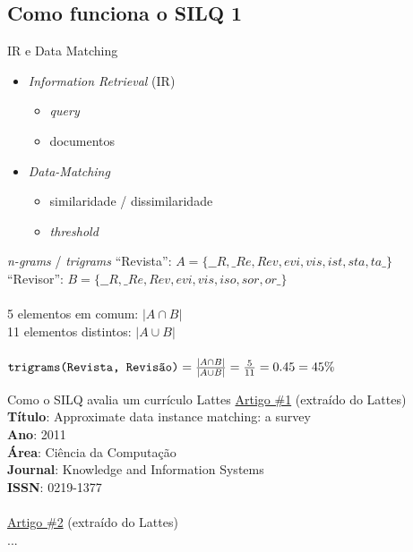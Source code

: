 \documentclass{beamer}
\newcommand{\quotes}[1]{``#1''}
\begin{document}
\subsection{Como funciona o SILQ 1}

\begin{frame}{IR e Data Matching}
  \begin{itemize}
    \item \textit{Information Retrieval} (IR)
    \begin{itemize}
      \item \textit{query}
      \item documentos
    \end{itemize}

    \item \textit{Data-Matching}
    \begin{itemize}
      \item similaridade / dissimilaridade
      \item \textit{threshold}
    \end{itemize}
  \end{itemize}
\end{frame}

\begin{frame}{\textit{n-grams} / \textit{trigrams}}
  \quotes{Revista}: $ A = \{\_\_R,\_Re,Rev,evi,vis,ist,sta,ta\_\}$ \\
  \quotes{Revisor}: $ B = \{\_\_R,\_Re,Rev,evi,vis,iso,sor,or\_\}$ \\

  \hfill \\
  5 elementos em comum: $|A \cap B|$\\
  11 elementos distintos: $|A \cup B|$\\

  \hfill \\
  $
  \texttt{trigrams(Revista, Revisão)} = {|A \cap B| \over |A \cup B|} = {5 \over 11} = 0.45 = 45\%
  $
\end{frame}

\begin{frame}{Como o SILQ avalia um currículo Lattes}
  \underline{Artigo \#1} (extraído do Lattes)\\
  \textbf{Título}: Approximate data instance matching: a survey\\
  \textbf{Ano}: 2011\\
  \textbf{Área}: Ciência da Computação\\
  \textbf{Journal}: Knowledge and Information Systems\\
  \textbf{ISSN}: 0219-1377\\

  \hfill \\
  \underline{Artigo \#2} (extraído do Lattes)\\
  ...
\end{frame}
\end{document}
